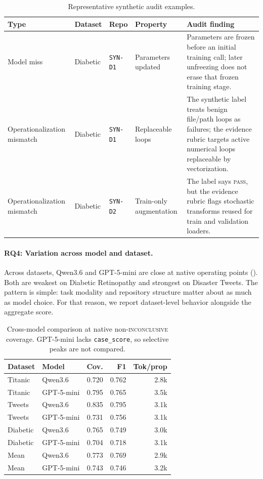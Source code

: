 \documentclass[11pt]{article}
\newcommand{\pass}{\textsc{pass}}
\newcommand{\inconclusive}{\textsc{inconclusive}}
\newcommand{\qwen}{Qwen3.6}
\begin{document}
\begin{table}[t]
  \centering
  \small
  \setlength{\tabcolsep}{4pt}
  \begin{tabularx}{\textwidth}{@{}p{2.3cm}p{1.4cm}p{2.25cm}p{2.2cm}X@{}}
    \toprule
    Type & Dataset & Repo & Property & Audit finding \\
    \midrule
    Model miss & Diabetic & \texttt{SYN-D1} & Parameters updated &
    Parameters are frozen before an initial training call; later unfreezing
    does not erase that frozen training stage. \\
    Operationalization mismatch & Diabetic & \texttt{SYN-D1} & Replaceable loops &
    The synthetic label treats benign file/path loops as failures; the evidence
    rubric targets active numerical loops replaceable by vectorization. \\
    Operationalization mismatch & Diabetic & \texttt{SYN-D2} & Train-only augmentation &
    The label says \pass, but the evidence rubric flags stochastic transforms
    reused for train and validation loaders. \\
    \bottomrule
  \end{tabularx}
  \caption{Representative synthetic audit examples.}
  \label{tab:synthetic-examples}
\end{table}

\paragraph{RQ4: Variation across model and dataset.}
Across datasets, \qwen{} and GPT-5-mini are close at native operating points
().
Both are weakest on Diabetic Retinopathy and strongest on Disaster Tweets.
The pattern is simple: task modality and repository structure matter about as
much as model choice.
For that reason, we report dataset-level behavior alongside the aggregate
score.

\begin{table}[t]
  \centering
  \small
  \begin{tabular}{llrrr}
    \toprule
    Dataset & Model & Cov. & F1 & Tok/prop \\
    \midrule
    Titanic & \qwen{} & 0.720 & 0.762 & 2.8k \\
    Titanic & GPT-5-mini & 0.795 & 0.765 & 3.5k \\
    Tweets & \qwen{} & 0.835 & 0.795 & 3.1k \\
    Tweets & GPT-5-mini & 0.731 & 0.756 & 3.1k \\
    Diabetic & \qwen{} & 0.765 & 0.749 & 3.0k \\
    Diabetic & GPT-5-mini & 0.704 & 0.718 & 3.1k \\
    Mean & \qwen{} & 0.773 & 0.769 & 2.9k \\
    Mean & GPT-5-mini & 0.743 & 0.746 & 3.2k \\
    \bottomrule
  \end{tabular}
  \caption{Cross-model comparison at native non-\inconclusive{} coverage.
  GPT-5-mini lacks \texttt{case\_score}, so selective peaks are not compared.}
  \label{tab:models}
\end{table}
\end{document}
